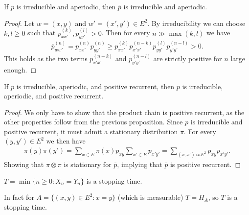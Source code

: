 {\color{blue}
\begin{prop}[]
	If $p$ is irreducible and aperiodic, then $\overline{p}$ is irreducible and aperiodic.
\end{prop}
\begin{proof}
	Let $w=(x,y)$ and $w'=(x',y') \in E^2$. By irreducibility we can choose $k,l\geq 0$ such that $p_{xx'}^{(k)}, p_{yy'}^{(l)} >0$. Then for every $n \gg \max(k,l)$ we have
\begin{align}
	\overline{p}_{ww'}^{(n)} = p_{xx'}^{(n)}p_{yy'}^{(n)} \geq p_{xx'}^{(k)}p_{x'x'}^{(n-k)} p_{yy'}^{(l)} p_{y'y'}^{(n-l)} > 0.
\end{align}
This holds as the two terms $p_{x'x'}^{(n-k)}$ and $p_{y'y'}^{(n-l)}$ are strictly positive for $n$ large enough.
\end{proof}

\begin{prop}[]
	If $p$ is irreducible, aperiodic, and positive recurrent, then $\overline{p}$ is irreducible, aperiodic, and positive recurrent.
\end{prop}
\begin{proof}
	We only have to show that the product chain is positive recurrent, as the other properties follow from the previous proposition. Since $p$ is irreducible and positive recurrent, it must admit a stationary distribution $\pi $. For every $(y,y')\in E^2$ we then have
\begin{align}
	\pi (y) \pi (y') = \sum_{x \in E}^{} \pi(x)p_{xy} \sum_{x' \in E}^{}p_{x'y'} = \sum_{(x,x')\ in E^2}^{} p_{xy}p_{x'y'}. 
\end{align}
Showing that $\pi \otimes \pi $ is stationary for $\overline{p}$, implying that $\overline{p}$ is positive recurrent.
\end{proof}
}
\begin{defn}
	$T=\min\{n\geq 0: X_n=Y_n\}$ is a stopping time.
\end{defn}
\begin{rmk}[]
	In fact for $A = \{ (x,y) \in E^2: x=y\}$ (which is measurable) $T=H_A$, so $T$ is a stopping time.
\end{rmk}


